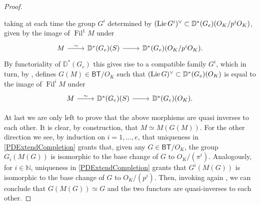 \begin{proof}
\begin{enumerate}
	taking at each time the group $G^i$ determined by $(\operatorname{Lie} G^i)^\vee \subset
	\mathbb{D}^*(G_e)(O_K/p^iO_K)$, given by the image of $\operatorname{Fil}^1 M$ under
	\begin{equation*}
	\begin{tikzcd}
		M \arrow[r, "\sim", rightarrow] &
		\mathbb{D}^*(G_e)(S) \arrow[r, "", rightarrow] &
		\mathbb{D}^*(G_e)(O_K/p^iO_K)
	.\end{tikzcd}
	\end{equation*}
	By functoriality of $\mathbb{D}^*(G_e)$ this gives rise to a compatible family $G^i$,
	which in turn, by \cite[Lemma 2.4.4]{deJong}, defines $G(M) \in \mathsf{BT}/O_K$
	such that $(\operatorname{Lie} G)^\vee \subset \mathbb{D}^*(G_e)(O_K)$ is
	equal to the image of $\operatorname{Fil}^iM$ under
	\begin{equation*}
	\begin{tikzcd}
		M \arrow[r, "\sim", rightarrow] &
		\mathbb{D}^*(G_e)(S) \arrow[r, "", rightarrow] &
		\mathbb{D}^*(G_e)(O_K)
	.\end{tikzcd}
	\end{equation*}
\end{enumerate}
At last we are only left to prove that the above morphisms are quasi inverses to each other.
It is clear, by construction, that $M \simeq M(G(M))$.
For the other direction we see, by induction on $i = 1, \ldots, e$, that uniqueness in
\cref{PDExtendCompletion} grants that, given any $G \in \mathsf{BT}/O_K$, 
the group $G_i(M(G))$ is isomorphic to the base change of $G$ to $O_K/ (\pi^i)$.
Analogously, for $i \in \mathbb{N}$, uniqueness in \cref{PDExtendCompletion} grants
that $G^i(M(G))$ is isomorphic to the base change of $G$ to $O_K/ (p^i)$.
Then, invoking again \cite[Lemma 2.4.4]{deJong}, we can conclude that $G(M(G)) \simeq G$
and the two functors are quasi-inverses to each other.
\end{proof}


